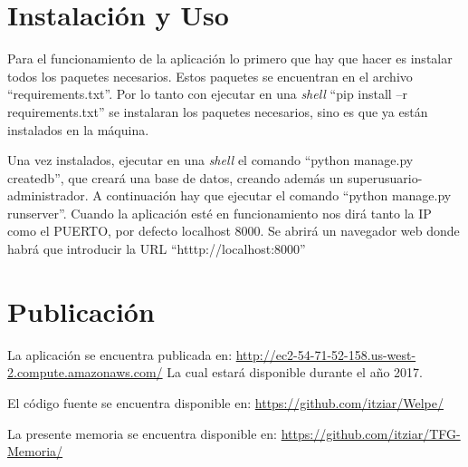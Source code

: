 \cleardoublepage
\appendix
\chapter{Instalación y Uso}
\label{app:instalacion}


Para el funcionamiento de la aplicación lo primero que hay que hacer es instalar todos los paquetes necesarios. Estos paquetes se encuentran en el archivo ``requirements.txt''. Por lo tanto con ejecutar en una \textit{shell} ``pip install –r requirements.txt'' se instalaran los paquetes necesarios, sino es que ya están instalados en la máquina.


Una vez instalados, ejecutar en una \textit{shell} el comando ``python manage.py createdb'', que creará una base de datos, creando además un superusuario-administrador. A continuación hay que ejecutar el comando ``python manage.py runserver''. Cuando la aplicación esté en funcionamiento nos dirá tanto la IP como el PUERTO, por defecto localhost 8000. Se abrirá un navegador web donde habrá que introducir la URL ``htttp://localhost:8000''

\cleardoublepage
\chapter{Publicación}
\label{app:publicacion}

La aplicación se encuentra publicada en: 
\url{http://ec2-54-71-52-158.us-west-2.compute.amazonaws.com/}
La cual estará disponible durante el año 2017.


El código fuente se encuentra disponible en:
\url{https://github.com/itziar/Welpe/}


La presente memoria se encuentra disponible en:
\url{https://github.com/itziar/TFG-Memoria/}




